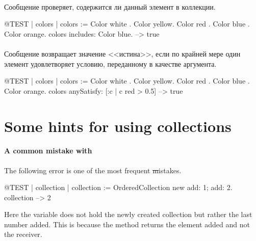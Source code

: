 \documentclass[a4paper,10pt,twoside]{book}
\begin{document}
\paragraph{} Сообщение  проверяет, содержится ли данный элемент в коллекции.

\begin{code}{@TEST | colors |}
colors := {Color white . Color yellow. Color red . Color blue . Color orange}.
colors includes: Color blue. --> true
\end{code}

\paragraph{} Сообщение  возвращает значение <<истина>>, если по крайней мере один элемент удовлетворяет условию, переданному в качестве аргумента.

\begin{code}{@TEST | colors | colors := {Color white . Color yellow. Color red . Color blue . Color orange}.}
colors anySatisfy: [:c | c red > 0.5] --> true
\end{code}
\section{Some hints for using collections}

\paragraph{A common mistake with } The following error is one of the most frequent \st mistakes.

\begin{code}{@TEST | collection | }
collection := OrderedCollection new add: 1; add: 2.
collection --> 2
\end{code}
\noindent
Here the variable  does not hold the newly created collection but rather the last number added. 
This is because the method  returns the element added and not the receiver.
\end{document}
